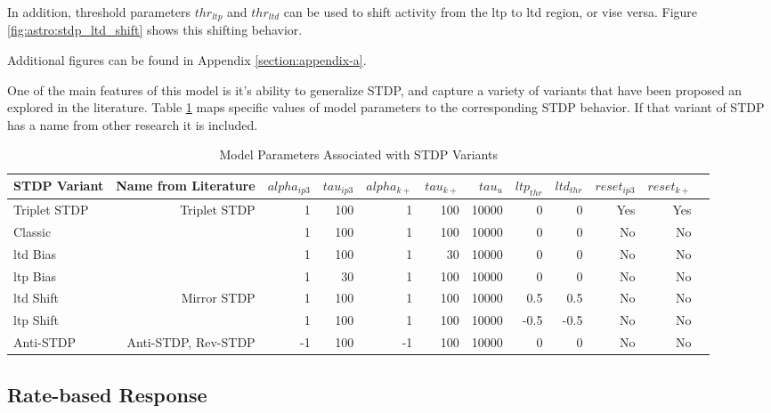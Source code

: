 
In addition, threshold parameters $thr_{ltp}$ and $thr_{ltd}$ can be used to
shift activity from the \Gls{ltp} to \Gls{ltd} region, or vise versa. Figure
\ref{fig:astro:stdp_ltd_shift} shows this shifting behavior.


Additional figures can be found in Appendix \ref{section:appendix-a}.

One of the main features of this model is it's ability to generalize STDP,
and capture a variety of variants that have been proposed an explored in the
literature. Table \ref{table:astro_varient_params} maps specific values of
model parameters to the corresponding STDP behavior. If that
variant of STDP has a name from other research it is included.

\begin{table}[!htp]\centering
\caption{Model Parameters Associated with STDP Variants} \label{table:astro_varient_params}
\scriptsize
\begin{tabular}{lrrrrrrrrrrr}\toprule
STDP Variant &Name from Literature &$alpha_{ip3}$ &$tau_{ip3}$ &$alpha_{k+}$ &$tau_{k+}$ &$tau_u$ &$ltp_{thr}$ &$ltd_{thr}$ &$reset_{ip3}$ &$reset_{k+}$ \\\midrule
Triplet STDP &Triplet STDP &1 &100 &1 &100 &10000 &0 &0 &Yes &Yes \\
Classic & &1 &100 &1 &100 &10000 &0 &0 &No &No \\
\Gls{ltd} Bias & &1 &100 &1 &30 &10000 &0 &0 &No &No \\
\Gls{ltp} Bias & &1 &30 &1 &100 &10000 &0 &0 &No &No \\
\Gls{ltd} Shift &Mirror STDP &1 &100 &1 &100 &10000 &0.5 &0.5 &No &No \\
\Gls{ltp} Shift & &1 &100 &1 &100 &10000 &-0.5 &-0.5 &No &No \\
Anti-STDP &Anti-STDP, Rev-STDP &-1 &100 &-1 &100 &10000 &0 &0 &No &No \\
\bottomrule
\end{tabular}
\end{table}

\subsection{Rate-based Response} \label{sec:rate_response}

